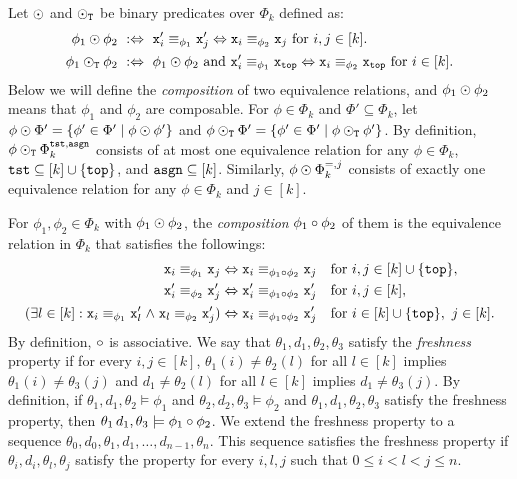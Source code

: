 Let $\odot$ and $\odot_{\mathtt{T}}$ be binary predicates over $\Phi_k$ defined as:
\begin{align*}
  \phi_1\COMPBL\phi_2 \ &:\Leftrightarrow \
      \R_i \equiv_{\phi_1} \R_j \Leftrightarrow \L_i \equiv_{\phi_2} \L_j
      \ \text{for } i,j\in[k].
  \\
%
  \phi_1\COMPBLT\phi_2 \ &:\Leftrightarrow \
      \phi_1\COMPBL\phi_2 \ \text{and} \
      \R_i \equiv_{\phi_1} \Ltop \Leftrightarrow \L_i \equiv_{\phi_2} \Ltop
      \ \text{for } i\in[k].
\end{align*}
Below we will define the \emph{composition} of two equivalence relations,
and $\phi_1\odot\phi_2$ means that
$\phi_1$ and $\phi_2$ are composable.
%
For $\phi\in\Phi_k$ and $\Phi'\subseteq\Phi_k$,
let $\phi\odot\Phi' = \{\phi'\in\Phi' \mid \phi\odot\phi'\}$
and $\phi\odot_{\mathtt{T}}\Phi' = \{\phi'\in\Phi' \mid \phi\odot_{\mathtt{T}}\phi'\}$.
By definition,
$\phi\odot_{\mathtt{T}}\Phi_k^{\mathtt{tst},\mathtt{asgn}}$ consists of at most one equivalence relation
for any $\phi\in\Phi_k$, $\mathtt{tst}\subseteq [k]\cup\{\mathtt{top}\}$,
and $\mathtt{asgn}\subseteq[k]$.
Similarly,
$\phi\odot\Phi_k^{=,j}$ consists of exactly one equivalence relation
for any $\phi\in\Phi_k$ and $j\in [k]$.


For $\phi_1,\phi_2\in\Phi_k$ with $\phi_1\odot\phi_2$,
the \emph{composition} $\phi_1\circ\phi_2$ of them
is the equivalence relation in $\Phi_k$ that satisfies the followings:
\begin{align*}
  {\tt x}_i \equiv_{\phi_1} {\tt x}_j &\Leftrightarrow
  {\tt x}_i \equiv_{\phi_1\circ\phi_2} {\tt x}_j &&\text{for } i,j\in [k]\cup\{\mathtt{top}\},\\
  {\tt x}'_i \equiv_{\phi_2} {\tt x}'_j &\Leftrightarrow
  {\tt x}'_i \equiv_{\phi_1\circ\phi_2} {\tt x}'_j &&\text{for } i,j\in [k],\\
  (\exists l\in [k] : {\tt x}_i \equiv_{\phi_1} {\tt x}'_l \mathrel{\land}
  {\tt x}_l \equiv_{\phi_2} {\tt x}'_j) &\Leftrightarrow
  {\tt x}_i \equiv_{\phi_1\circ\phi_2} {\tt x}'_j
  &&\text{for } i\in[k]\cup\{\mathtt{top}\},\ j\in [k].
\end{align*}
%
By definition, $\circ$ is associative.
We say that
$\theta_1,d_1,\theta_2,\theta_3$ satisfy
the \emph{freshness} property
if for every $i,j\in [k]$,
$\theta_1(i)\ne\theta_2(l)$ for all $l\in[k]$
implies $\theta_1(i)\ne\theta_3(j)$
and $d_1\ne\theta_2(l)$ for all $l\in[k]$
implies $d_1\ne\theta_3(j)$.
By definition,
if $\theta_1,d_1,\theta_2\models\phi_1$ and
$\theta_2,d_2,\theta_3\models\phi_2$ and
$\theta_1,d_1,\theta_2,\theta_3$ satisfy the freshness property,
then
$\theta_1\,d_1,\theta_3\models\phi_1\circ\phi_2$.
We extend the freshness property to
a sequence $\theta_0,d_0,\theta_1,d_1,\ldots,d_{n-1},\theta_n$.
This sequence satisfies the freshness property if
$\theta_i,d_i,\theta_l,\theta_j$ satisfy
the property for every $i,l,j$ such that $0\le i < l < j\le n$.

